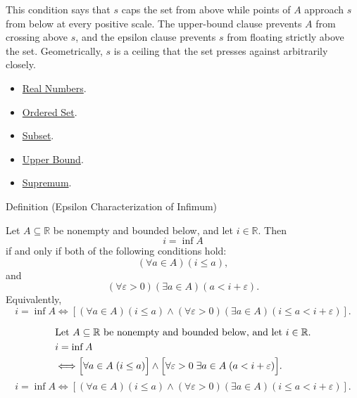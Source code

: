 \begin{remark*}[Interpretation]
This condition says that $s$ caps the set from above while points of $A$ approach $s$ from below at every positive scale. The upper-bound clause prevents $A$ from crossing above $s$, and the epsilon clause prevents $s$ from floating strictly above the set. Geometrically, $s$ is a ceiling that the set presses against arbitrarily closely.
\end{remark*}

\begin{dependencies}
\begin{itemize}
\item \hyperref[def:reals]{Real Numbers}.
\item \hyperref[def:ordered-set]{Ordered Set}.
\item \hyperref[def:subset]{Subset}.
\item \hyperref[def:real-upper-bound]{Upper Bound}.
\item \hyperref[def:supremum]{Supremum}.
\end{itemize}
\end{dependencies}






















\begin{definitionbox}{Definition (Epsilon Characterization of Infimum)}
\begin{definition}
\label{def:epsilon-characterization-of-infimum}
Let $A\subseteq\mathbb{R}$ be nonempty and bounded below, and let
$i\in\mathbb{R}$. Then
\[
  i=\inf A
\]
if and only if both of the following conditions hold:
\[
  (\forall a\in A)(i\leq a),
\]
and
\[
  (\forall\varepsilon>0)(\exists a\in A)(a<i+\varepsilon).
\]
Equivalently,
\[
  i=\inf A
  \Longleftrightarrow
  \left[
    (\forall a\in A)(i\leq a)
    \land
    (\forall\varepsilon>0)(\exists a\in A)(i\leq a<i+\varepsilon)
  \right].
\]
\end{definition}
\end{definitionbox}

\begin{remark*}
\[
\begin{aligned}
&\text{Let } A\subseteq\mathbb{R} \text{ be nonempty and bounded below, and let } i\in\mathbb{R}.\\
&i=\inf A\\
&\Longleftrightarrow
\Bigl[\forall a\in A\;(i\le a)\Bigr]
\land
\Bigl[\forall \varepsilon>0\;\exists a\in A\;(a<i+\varepsilon)\Bigr].
\end{aligned}
\]
\[
i=\inf A
\Longleftrightarrow
\left[
(\forall a\in A)(i\leq a)
\land
(\forall\varepsilon>0)(\exists a\in A)(i\leq a<i+\varepsilon)
\right].
\]
\end{remark*}

